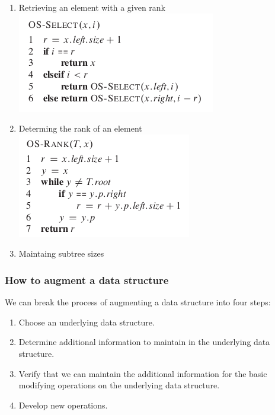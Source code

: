 \documentclass[11pt]{article}
\begin{document}
\begin{enumerate}
\item Retrieving an element with a given rank
\label{sec-4-5-1-1}
\includegraphics[width=.9\linewidth]{pics/c14_os_select.png} \\

\item Determing the rank of an element
\label{sec-4-5-1-2}
\includegraphics[width=.9\linewidth]{pics/c14_os_rank.png} \\

\item Maintaing subtree sizes
\label{sec-4-5-1-3}
\end{enumerate}

\subsubsection{How to augment a data structure}
\label{sec-4-5-2}
We can break the process of augmenting a data structure into four steps: \\
\begin{enumerate}
\item Choose an underlying data structure. \\
\item Determine additional information to maintain in the underlying data structure. \\
\item Verify that we can maintain the additional information for the basic modifying operations on the underlying data structure. \\
\item Develop new operations. \\
\end{enumerate}
\end{document}
